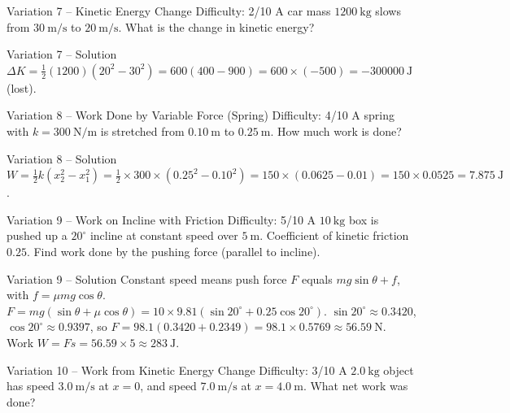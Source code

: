 \documentclass[11pt]{beamer}
\begin{document}
\begin{frame}[shrink=15]{Variation 7 – Kinetic Energy Change \hfill Difficulty: 2/10}
A car mass $1200\ \mathrm{kg}$ slows from $30\ \mathrm{m/s}$ to $20\ \mathrm{m/s}$. What is the change in kinetic energy?
\end{frame}

\begin{frame}{Variation 7 – Solution}
$\Delta K = \frac12 (1200)(20^2 - 30^2) = 600(400-900) = 600\times(-500) = -300000\ \mathrm{J}$ (lost).
\end{frame}

\begin{frame}[shrink=15]{Variation 8 – Work Done by Variable Force (Spring) \hfill Difficulty: 4/10}
A spring with $k = 300\ \mathrm{N/m}$ is stretched from $0.10\ \mathrm{m}$ to $0.25\ \mathrm{m}$. How much work is done?
\end{frame}

\begin{frame}{Variation 8 – Solution}
$W = \frac12 k (x_2^2 - x_1^2) = \frac12 \times 300 \times (0.25^2 - 0.10^2) = 150 \times (0.0625 - 0.01) = 150 \times 0.0525 = 7.875\ \mathrm{J}$.
\end{frame}

\begin{frame}[shrink=15]{Variation 9 – Work on Incline with Friction \hfill Difficulty: 5/10}
A $10\ \mathrm{kg}$ box is pushed up a $20^\circ$ incline at constant speed over $5\ \mathrm{m}$. Coefficient of kinetic friction $0.25$. Find work done by the pushing force (parallel to incline).
\end{frame}

\begin{frame}[shrink=15]{Variation 9 – Solution}
Constant speed means push force $F$ equals $mg\sin\theta + f$, with $f = \mu mg\cos\theta$.
$F = mg(\sin\theta + \mu\cos\theta) = 10\times9.81(\sin20^\circ + 0.25\cos20^\circ)$.
$\sin20^\circ \approx 0.3420$, $\cos20^\circ \approx 0.9397$, so $F = 98.1(0.3420 + 0.2349) = 98.1\times0.5769 \approx 56.59\ \mathrm{N}$.
Work $W = F s = 56.59\times5 \approx 283\ \mathrm{J}$.
\end{frame}

\begin{frame}[shrink=15]{Variation 10 – Work from Kinetic Energy Change \hfill Difficulty: 3/10}
A $2.0\ \mathrm{kg}$ object has speed $3.0\ \mathrm{m/s}$ at $x=0$, and speed $7.0\ \mathrm{m/s}$ at $x=4.0\ \mathrm{m}$. What net work was done?
\end{frame}
\end{document}

